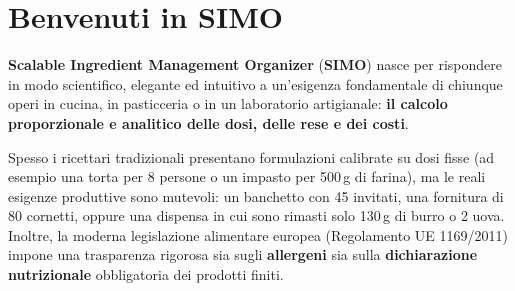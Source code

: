 \documentclass[11pt,a4paper]{article}
\begin{document}
\tableofcontents
\newpage

\section{Benvenuti in SIMO}
\textbf{Scalable Ingredient Management Organizer} (\textbf{SIMO}) nasce per rispondere in modo scientifico, elegante ed intuitivo a un'esigenza fondamentale di chiunque operi in cucina, in pasticceria o in un laboratorio artigianale: \textbf{il calcolo proporzionale e analitico delle dosi, delle rese e dei costi}.

Spesso i ricettari tradizionali presentano formulazioni calibrate su dosi fisse (ad esempio una torta per 8 persone o un impasto per 500\,g di farina), ma le reali esigenze produttive sono mutevoli: un banchetto con 45 invitati, una fornitura di 80 cornetti, oppure una dispensa in cui sono rimasti solo 130\,g di burro o 2 uova. Inoltre, la moderna legislazione alimentare europea (Regolamento UE 1169/2011) impone una trasparenza rigorosa sia sugli \textbf{allergeni} sia sulla \textbf{dichiarazione nutrizionale} obbligatoria dei prodotti finiti.
\end{document}
